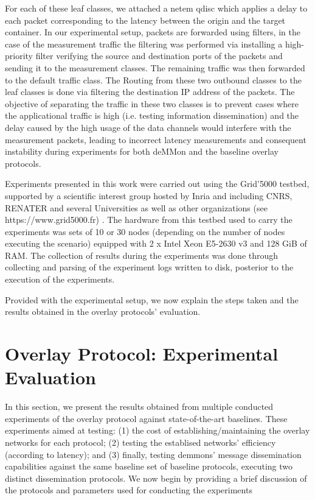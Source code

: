 For each of these leaf classes, we attached a netem qdisc which applies a delay to each packet corresponding to the latency between the origin and the target container. In our experimental setup, packets are forwarded using filters, in the case of the measurement traffic the filtering was performed via installing a high-priority filter verifying the source and destination ports of the packets and sending it to the measurement classes. The remaining traffic was then forwarded to the default traffic class. The Routing from these two outbound classes to the leaf classes is done via filtering the destination IP address of the packets.  The objective of separating the traffic in these two classes is to prevent cases where the applicational traffic is high (i.e. testing information dissemination) and the delay caused by the high usage of the data channels would interfere with the measurement packets, leading to incorrect latency measurements and consequent instability during experiments for both deMMon and the baseline overlay protocols. 

Experiments presented in this work were carried out using the Grid'5000 testbed, supported by a scientific interest group hosted by Inria and including CNRS, RENATER and several Universities as well as other organizations (see https://www.grid5000.fr) . The hardware from this testbed used to carry the experiments was sets of 10 or 30 nodes (depending on the number of nodes executing the scenario) equipped with 2 x Intel Xeon E5-2630 v3 and 128 GiB of RAM. The collection of results during the experiments was done through collecting and parsing of the experiment logs written to disk, posterior to the execution of the experiments.

Provided with the experimental setup, we now explain the steps taken and the results obtained in the overlay protocols' evaluation.

\section{Overlay Protocol: Experimental Evaluation} \label{sec:overlay_proto_eval}

In this section, we present the results obtained from multiple conducted experiments of the overlay protocol against state-of-the-art baselines. These experiments aimed at testing: (1) the cost of establishing/maintaining the overlay networks for each protocol; (2) testing the establised networks' efficiency (according to latency); and (3) finally, testing demmons' message dissemination capabilities against the same baseline set of baseline protocols, executing two distinct dissemination protocols. We now begin by providing a brief discussion of the protocols and parameters used for conducting the experiments

